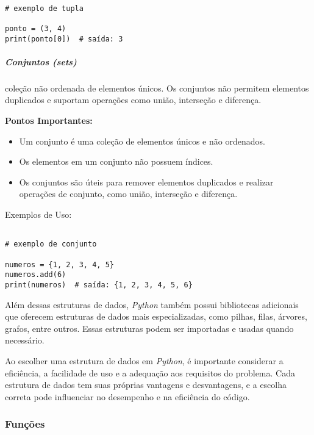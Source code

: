 \documentclass[a4paper, 12pt, onecolumn,singlespacing]{article}
\begin{document}
	\begin{verbatim}

# exemplo de tupla

ponto = (3, 4)
print(ponto[0])  # saída: 3

	\end{verbatim}

	\subparagraph{Conjuntos (\textit{sets})} coleção não ordenada de elementos únicos. Os conjuntos não permitem elementos duplicados e suportam operações como união, interseção e diferença.
	
	\textbf{Pontos Importantes:}
	\begin{itemize}
		\item Um conjunto é uma coleção de elementos únicos e não ordenados.
		\item Os elementos em um conjunto não possuem índices.
		\item Os conjuntos são úteis para remover elementos duplicados e realizar operações de conjunto, como união, interseção e diferença.
	\end{itemize}
		Exemplos de Uso:
	
	\begin{verbatim}
		
# exemplo de conjunto

numeros = {1, 2, 3, 4, 5}
numeros.add(6)
print(numeros)  # saída: {1, 2, 3, 4, 5, 6}

	\end{verbatim}

	Além dessas estruturas de dados, \textit{Python} também possui bibliotecas adicionais que oferecem estruturas de dados mais especializadas, como pilhas, filas, árvores, grafos, entre outros. Essas estruturas podem ser importadas e usadas quando necessário.
	
	Ao escolher uma estrutura de dados em \textit{Python}, é importante considerar a eficiência, a facilidade de uso e a adequação aos requisitos do problema. Cada estrutura de dados tem suas próprias vantagens e desvantagens, e a escolha correta pode influenciar no desempenho e na eficiência do código.
	
	\subsubsection{Funções}
	
\end{document}
